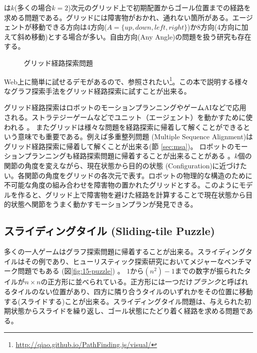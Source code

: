 は$k$(多くの場合$k=2$)次元のグリッド上で初期配置からゴール位置までの経路を求める問題である\cite{yap2002grid}。グリッドには障害物がおかれ、通れない箇所がある。エージェントが移動できる方向は4方向($A= \{up, down, left, right\}$)か8方向(4方向に加えて斜め移動)とする場合が多い。自由方向(Any Angle)の問題を扱う研究も存在する\cite{nash2007theta}。

\begin{figure}
        \centering
        \begin{tikzpicture}[scale=0.5]
          
        \end{tikzpicture}
	\caption{グリッド経路探索問題}
	\label{fig:grid-pathfinding}
\end{figure}


Web上に簡単に試せるデモがあるので、参照されたい\footnote{\url{http://qiao.github.io/PathFinding.js/visual/}}。この本で説明する様々なグラフ探索手法をグリッド経路探索に試すことが出来る。%

グリッド経路探索はロボットのモーションプランニングやゲームAIなどで応用される\cite{algfoor2015comprehensive}。ストラテジーゲームなどでユニット（エージェント）を動かすために使われる \cite{cui2011based,sturtevant2012benchmarks}。%
またグリッドは様々な問題を経路探索に帰着して解くことができるという意味でも重要である。例えば多重整列問題 (Multiple Sequence Alignment)はグリッド経路探索に帰着して解くことが出来る(節 \ref{sec:msa})。
ロボットのモーションプランニングも経路探索問題に帰着することが出来ることがある \cite{barraquand91}。$k$個の関節の角度を変えながら、現在状態から目的の状態 (Configuration)に近づけたい。各関節の角度をグリッドの各次元で表す。ロボットの物理的な構造のために不可能な角度の組み合わせを障害物の置かれたグリッドとする。このようにモデルを作ると、グリッド上で障害物を避けた経路を計算することで現在状態から目的状態へ関節をうまく動かすモーションプランが発見できる。


\subsection{スライディングタイル (Sliding-tile Puzzle)}

多くの一人ゲームはグラフ探索問題に帰着することが出来る。スライディングタイルはその例であり、ヒューリスティック探索研究においてメジャーなベンチマーク問題でもある (図\ref{fig:15-puzzle}) \cite{johnson1879notes}。
$1$から$(n^2)-1$までの数字が振られたタイルが$n\times n$の正方形に並べられている。正方形には一つだけ{\it ブランク}と呼ばれるタイルのない位置があり、四方に隣り合うタイルのいずれかをその位置に移動する(スライドする)ことが出来る。スライディングタイル問題は、与えられた初期状態からスライドを繰り返し、ゴール状態にたどり着く経路を求める問題である。

